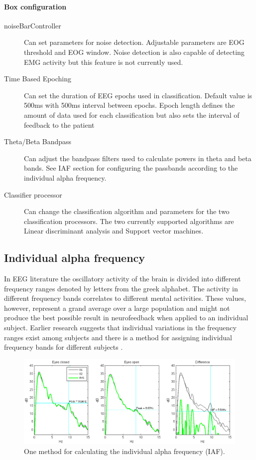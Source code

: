 \paragraph{Box configuration}

\begin{description}
\item[noiseBarController] Can set parameters for noise detection. Adjustable parameters are EOG threshold and EOG window. Noise detection is also capable of detecting EMG activity but this feature is not currently used.
\item[Time Based Epoching] Can set the duration of EEG  epochs used in classification. Default value is 500ms with 500ms interval between epochs. Epoch length defines the amount of data used for each classification but also sets the interval of feedback to the patient
\item[Theta/Beta Bandpass] Can adjust the bandpass filters used to calculate powers in theta and beta bands. See IAF section for configuring the passbands according to the individual alpha frequency.
\item[Classifier processor] Can change the classification algorithm and parameters for the two classification processors. The two currently supported algorithms are Linear discriminant analysis and Support vector machines. 
\end{description}

\subsection{Individual alpha frequency}
In EEG literature the oscillatory activity of the brain is divided into different frequency ranges denoted by letters from the greek alphabet. The activity in different frequency bands correlates to different mental activities. These values, however, represent a grand average over a large population and might not produce the best possible result in neurofeedback when applied to an individual subject. Earlier research suggests that individual variations in the frequency ranges exist among subjects and there is a method for assigning individual frequency bands for different subjects \cite{klimesch1999eeg}. 

\begin{figure}[ht]
	\centering
	\includegraphics[scale=0.6]{IAF.png}
	\caption{One method for calculating the individual alpha frequency (IAF).}
\end{figure}

